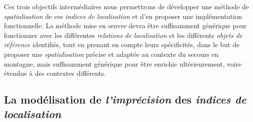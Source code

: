 Ces trois objectifs intermédiaires nous permettrons de développer une
méthode de \emph{spatialisation} de ces \emph{indices de localisation}
et d'en proposer une implémentation fonctionnelle. La méthode mise en
œuvre devra être suffisamment générique pour fonctionner avec les
différentes \emph{relations de localisation} et les différents
\emph{objets de référence} identifiés, tout en prenant en compte leurs
spécificités, dans le but de proposer une \emph{spatialisation}
précise et adaptée au contexte du secours en montagne, mais
suffisamment générique pour être enrichie ultérieurement, voire
étendue à des contextes différents.

\subsection{La modélisation de \emph{l'imprécision} des \emph{indices
    de localisation}}
\label{subsec:2-1-2}

